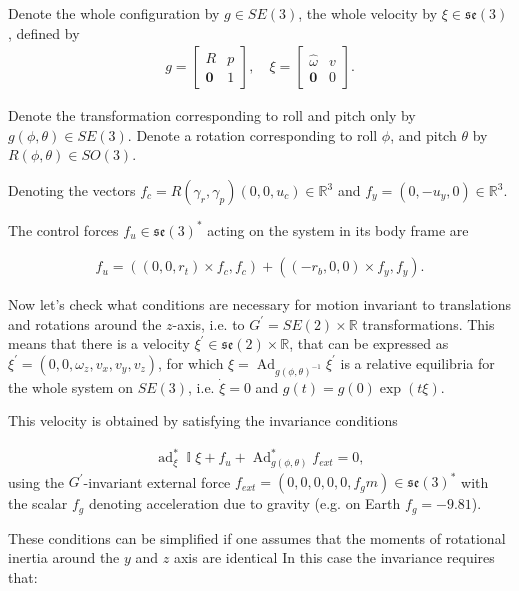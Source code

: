 \-Denote the whole configuration by $ g \in SE(3) $, the whole velocity by $ \xi \in \mathfrak{se}(3)$, defined by \begin{align*} g = \left[\begin{array}{cc} R & p \\ \mathbf{0} & 1 \end{array}\right], \quad \xi = \left[ \begin{array}{cc} \widehat\omega & v \\ \mathbf{0} & 0 \end{array}\right]. \end{align*}

\-Denote the transformation corresponding to roll and pitch only by $ g(\phi,\theta) \in SE(3) $. \-Denote a rotation corresponding to roll $\phi$, and pitch $\theta$ by $ R(\phi, \theta) \in SO(3) $.

\-Denoting the vectors $ f_c = R(\gamma_r, \gamma_p) (0,0,u_c)\in \mathbb{R}^3 $ and $ f_y = (0, -u_y, 0) \in \mathbb{R}^3$.

\-The control forces $ f_u \in \mathfrak{se}(3)^*$ acting on the system in its body frame are

\begin{align*} f_u = ((0,0,r_t) \times f_c, f_c) + ((-r_b,0,0) \times f_y, f_y). \end{align*}

\-Now let's check what conditions are necessary for motion invariant to translations and rotations around the $ z $-\/axis, i.\-e. to $ G^{\prime} = SE(2)\times \mathbb{R}$ transformations. \-This means that there is a velocity $ \xi^{\prime}\in \mathfrak{se}(2) \times \mathbb{R} $, that can be expressed as $ \xi^{\prime}=(0, 0, \omega_z, v_x, v_y, v_z)$, for which $ \xi = \operatorname{Ad}_{g(\phi,\theta)^{-1}}\xi^{\prime} $ is a relative equilibria for the whole system on $ SE(3) $, i.\-e. $ \dot \xi = 0 $ and $ g(t) = g(0)\exp(t\xi) $.

\-This velocity is obtained by satisfying the invariance conditions

\begin{align*} \operatorname{ad}_\xi^* \operatorname{\mathbb{I}} \xi + f_u + \operatorname{Ad}^{\ast}_{g(\phi,\theta)} f_{ext} = 0, \end{align*} using the $G^\prime$-\/invariant external force $ f_{ext} = (0,0,0,0,0,f_g m) \in \mathfrak{se}(3)^* $ with the scalar $ f_g $ denoting acceleration due to gravity (e.\-g. on \-Earth $ f_g=-9.81 $).

\-These conditions can be simplified if one assumes that the moments of rotational inertia around the $ y $ and $ z $ axis are identical \-In this case the invariance requires that\-:


